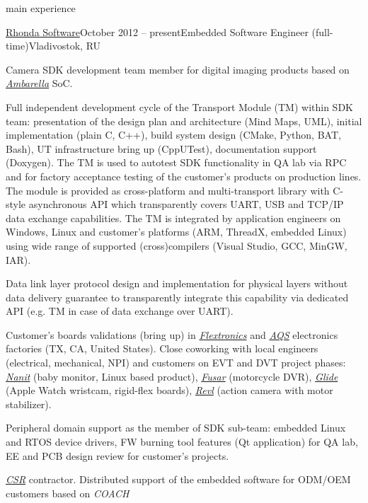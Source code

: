 \documentclass{template}
\begin{document}
\begin{rSection}{main experience}
\begin{rCompany}{\href{http://www.rhondasoftware.com}{Rhonda Software}}{October 2012 -- present}{Embedded Software Engineer (full-time)}{Vladivostok, RU}

\item Camera SDK development team member for digital imaging products based on \href{http://www.ambarella.com}{\textit{Ambarella}} SoC.
\item Full independent development cycle of the Transport Module (TM) within SDK team: presentation of the design plan and architecture
      (Mind Maps, UML), initial implementation (plain C, C++), build system design (CMake, Python, BAT, Bash), UT infrastructure bring up
      (CppUTest), documentation support (Doxygen). The TM is used to autotest SDK functionality in QA lab via RPC and for factory acceptance
      testing of the customer's products on production lines. The module is provided as cross-platform and multi-transport library with C-style
      asynchronous API which transparently covers UART, USB and TCP/IP data exchange capabilities. The TM is integrated by application engineers
      on Windows, Linux and customer's platforms (ARM, ThreadX, embedded Linux) using wide range of supported (cross)compilers (Visual Studio,
      GCC, MinGW, IAR).
\item Data link layer protocol design and implementation for physical layers without data delivery guarantee to transparently integrate this
      capability via dedicated API (e.g. TM in case of data exchange over UART).
\item Customer's boards validations (bring up) in \href{http://www.flextronics.com}{\textit{Flextronics}} and \href{http://aqs-inc.com}{\textit{AQS}}
      electronics factories (TX, CA, United States). Close coworking with local engineers (electrical, mechanical, NPI) and customers on EVT and DVT
      project phases: \href{https://www.nanit.com}{\textit{Nanit}} (baby monitor, Linux based product), \href{https://fusar.com}{\textit{Fusar}}
      (motorcycle DVR), \href{http://www.glide.me}{\textit{Glide}} (Apple Watch wristcam, rigid-flex boards), \href{https://revl.com}{\textit{Revl}}
      (action camera with motor stabilizer).
\item Peripheral domain support as the member of SDK sub-team: embedded Linux and RTOS device drivers, FW burning tool features (Qt application)
      for QA lab, EE and PCB design review for customer's projects.
\item \href{http://www.csr.com}{\textit{CSR}} contractor. Distributed support of the embedded software for ODM/OEM customers based on \textit{COACH}

\end{rCompany}
\end{rSection}
\end{document}
